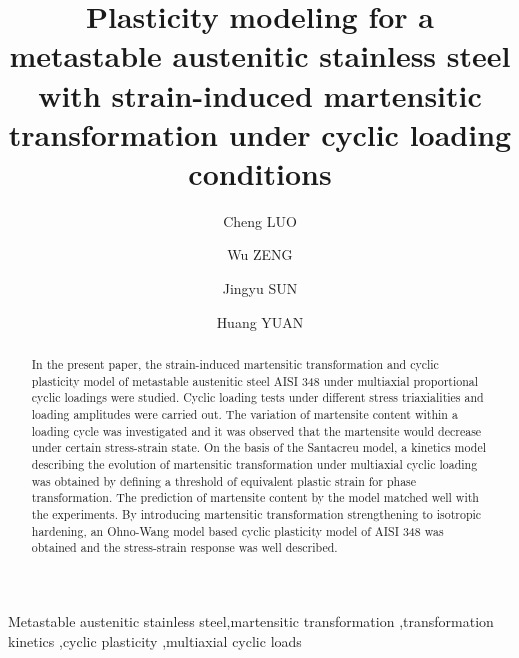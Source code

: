 \documentclass[preprint,5p,twocolumn,10pt,sort&compress]{elsarticle}
\begin{document}
\begin{frontmatter}



\title{Plasticity modeling for a metastable austenitic stainless steel with strain-induced martensitic transformation under cyclic loading conditions}


\author{Cheng LUO}
\author{Wu ZENG}
\author{Jingyu SUN}
\author{Huang YUAN}

\address{School of Aerospace Engineering, Tsinghua University, Beijing, China}

\begin{abstract}
In the present paper, the strain-induced martensitic transformation and cyclic plasticity model of metastable austenitic steel AISI 348 under multiaxial proportional cyclic loadings were studied. Cyclic loading tests under different stress triaxialities and loading amplitudes were carried out. The variation of martensite content within a loading cycle was investigated and it was observed that the martensite would decrease under certain stress-strain state. On the basis of the Santacreu model, a kinetics model describing the evolution of martensitic transformation under multiaxial cyclic loading was obtained by defining a threshold of equivalent plastic strain for phase transformation. The prediction of martensite content by the model matched well with the experiments. By introducing martensitic transformation strengthening to isotropic hardening, an Ohno-Wang model based cyclic plasticity model of AISI 348 was obtained and the stress-strain response was well described.
\end{abstract}

%
\begin{keyword}
Metastable austenitic stainless steel\sep martensitic transformation \sep transformation kinetics  \sep cyclic plasticity \sep multiaxial cyclic loads

\end{keyword}
\end{frontmatter}
\end{document}
